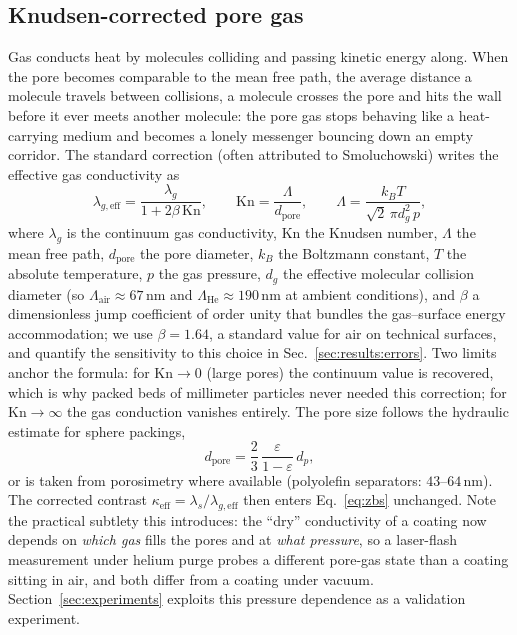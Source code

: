 \documentclass[10pt,a4paper]{article}
\newcommand{\lams}{\lambda_{s}}
\newcommand{\lamg}{\lambda_{g}}
\newcommand{\Kn}{\mathrm{Kn}}
\begin{document}
\subsection{Knudsen-corrected pore gas}
\label{sec:model:knudsen}

Gas conducts heat by molecules colliding and passing kinetic energy along. When the pore becomes comparable to the mean free path, the average distance a molecule travels between collisions, a molecule crosses the pore and hits the wall before it ever meets another molecule: the pore gas stops behaving like a heat-carrying medium and becomes a lonely messenger bouncing down an empty corridor. The standard correction (often attributed to Smoluchowski) writes the effective gas conductivity as
\begin{equation}
\lambda_{g,\mathrm{eff}}
=\frac{\lamg}{1+2\beta\,\Kn},
\qquad
\Kn=\frac{\Lambda}{d_{\mathrm{pore}}},
\qquad
\Lambda=\frac{k_{B}T}{\sqrt{2}\,\pi d_{g}^{2}\,p},
\label{eq:knudsen}
\end{equation}
where $\lamg$ is the continuum gas conductivity, $\Kn$ the Knudsen number, $\Lambda$ the mean free path, $d_{\mathrm{pore}}$ the pore diameter, $k_B$ the Boltzmann constant, $T$ the absolute temperature, $p$ the gas pressure, $d_g$ the effective molecular collision diameter (so $\Lambda_{\mathrm{air}}\approx67$\,nm and $\Lambda_{\mathrm{He}}\approx190$\,nm at ambient conditions), and $\beta$ a dimensionless jump coefficient of order unity that bundles the gas--surface energy accommodation; we use $\beta=1.64$, a standard value for air on technical surfaces, and quantify the sensitivity to this choice in Sec.~\ref{sec:results:errors}. Two limits anchor the formula: for $\Kn\to0$ (large pores) the continuum value is recovered, which is why packed beds of millimeter particles never needed this correction; for $\Kn\to\infty$ the gas conduction vanishes entirely. The pore size follows the hydraulic estimate for sphere packings,
\begin{equation}
d_{\mathrm{pore}}=\frac{2}{3}\,\frac{\varepsilon}{1-\varepsilon}\,d_{p},
\label{eq:dpore}
\end{equation}
or is taken from porosimetry where available (polyolefin separators: $43$--$64$\,nm). The corrected contrast $\kappa_{\mathrm{eff}}=\lams/\lambda_{g,\mathrm{eff}}$ then enters Eq.~\eqref{eq:zbs} unchanged. Note the practical subtlety this introduces: the ``dry'' conductivity of a coating now depends on \emph{which gas} fills the pores and at \emph{what pressure}, so a laser-flash measurement under helium purge probes a different pore-gas state than a coating sitting in air, and both differ from a coating under vacuum. Section~\ref{sec:experiments} exploits this pressure dependence as a validation experiment.
\end{document}
